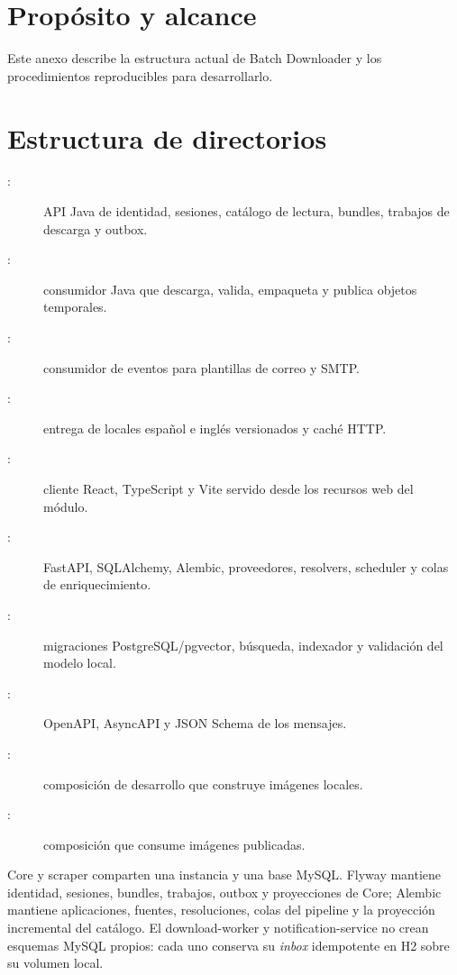 
\section{Propósito y alcance}

Este anexo describe la estructura actual de Batch Downloader y los procedimientos reproducibles para desarrollarlo.

\section{Estructura de directorios}

\begin{description}
	\item[:] API Java de identidad, sesiones, catálogo de lectura, bundles, trabajos de descarga y outbox.
	\item[:] consumidor Java que descarga, valida, empaqueta y publica objetos temporales.
	\item[:] consumidor de eventos para plantillas de correo y SMTP.
	\item[:] entrega de locales español e inglés versionados y caché HTTP.
	\item[:] cliente React, TypeScript y Vite servido desde los recursos web del módulo.
	\item[:] FastAPI, SQLAlchemy, Alembic, proveedores, resolvers, scheduler y colas de enriquecimiento.
	\item[:] migraciones PostgreSQL/pgvector, búsqueda, indexador y validación del modelo local.
	\item[:] OpenAPI, AsyncAPI y JSON Schema de los mensajes.
	\item[:] composición de desarrollo que construye imágenes locales.
	\item[:] composición que consume imágenes publicadas.
\end{description}

Core y scraper comparten una instancia y una base MySQL. Flyway mantiene identidad, sesiones, bundles, trabajos, outbox y proyecciones de Core; Alembic mantiene aplicaciones, fuentes, resoluciones, colas del pipeline y la proyección incremental del catálogo. El download-worker y notification-service no crean esquemas MySQL propios: cada uno conserva su \emph{inbox} idempotente en H2 sobre su volumen local.

